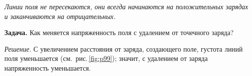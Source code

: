 \documentclass[main.tex]{subfiles}
\begin{document}
\begin{NoHyper}
\emph{Линии поля не пересекаются, они всегда начинаются на положительных зарядах и заканчиваются на отрицательных.}

\medskip

\noindent\textbf{Задача.} Как меняется напряженность поля с удалением от точечного заряда?

\smallskip

\noindent\emph{Решение}. С увеличением расстояния от заряда, создающего поле, густота линий поля уменьшается (см.~рис.\,\ref{fig:p99}); значит, с удалением от заряда напряженность уменьшается.




\end{NoHyper}
\end{document}
